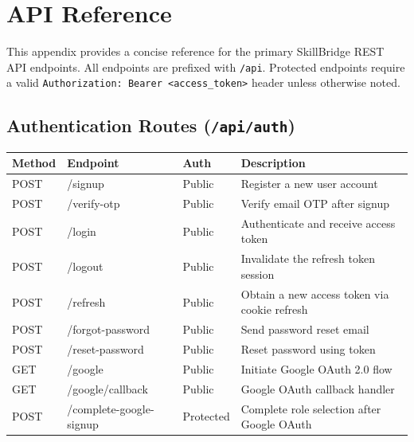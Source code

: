 
\chapter{API Reference}

\label{AppendixA}


This appendix provides a concise reference for the primary SkillBridge REST API endpoints.
All endpoints are prefixed with \texttt{/api}. Protected endpoints require a valid
\texttt{Authorization: Bearer <access\_token>} header unless otherwise noted.

\section{Authentication Routes (\texttt{/api/auth})}

\begin{longtable}{|p{2.5cm}|p{4cm}|p{2cm}|p{5cm}|}
\hline
\textbf{Method} & \textbf{Endpoint} & \textbf{Auth} & \textbf{Description} \\ \hline
\endhead
POST & /signup & Public & Register a new user account \\ \hline
POST & /verify-otp & Public & Verify email OTP after signup \\ \hline
POST & /login & Public & Authenticate and receive access token \\ \hline
POST & /logout & Public & Invalidate the refresh token session \\ \hline
POST & /refresh & Public & Obtain a new access token via cookie refresh \\ \hline
POST & /forgot-password & Public & Send password reset email \\ \hline
POST & /reset-password & Public & Reset password using token \\ \hline
GET & /google & Public & Initiate Google OAuth 2.0 flow \\ \hline
GET & /google/callback & Public & Google OAuth callback handler \\ \hline
POST & /complete-google-signup & Protected & Complete role selection after Google OAuth \\ \hline
\end{longtable}

